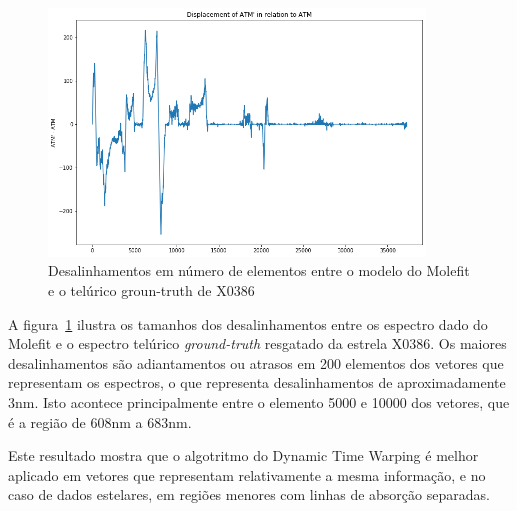 \begin{figure}[htb]
\centering
\includegraphics[width=10cm]{figuras/x0386_displacement.png}
\caption{Desalinhamentos em número de elementos entre o modelo do Molefit e o telúrico groun-truth de X0386}
\label{fig:x0386-displacement}
\end{figure}

A figura~\ref{fig:x0386-displacement} ilustra os tamanhos dos desalinhamentos entre os espectro dado do Molefit e o espectro telúrico \textit{ground-truth} resgatado da estrela X0386. Os maiores desalinhamentos são adiantamentos ou atrasos em 200 elementos dos vetores que representam os espectros, o que representa desalinhamentos de aproximadamente 3nm. Isto acontece principalmente entre o elemento 5000 e 10000 dos vetores, que é a região de 608nm a 683nm.

Este resultado mostra que o algotritmo do Dynamic Time Warping é melhor aplicado em vetores que representam relativamente a mesma informação, e no caso de dados estelares, em regiões menores com linhas de absorção separadas. 

